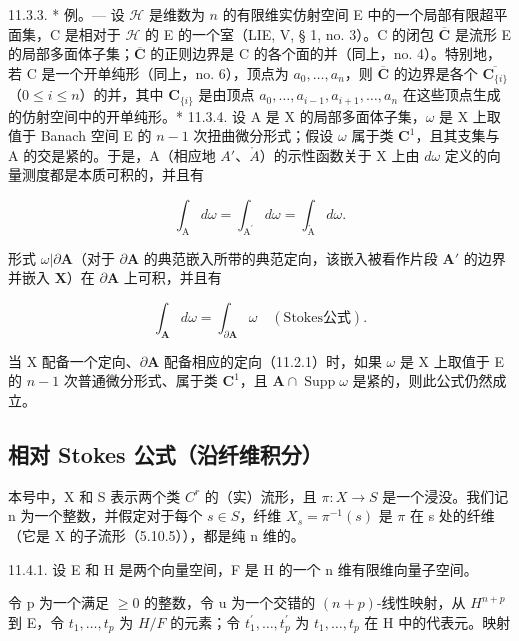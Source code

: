 11.3.3. * 例。--- 设 \(\mathcal{H}\) 是维数为 \(n\) 的有限维实仿射空间 E 中的一个局部有限超平面集，C 是相对于 \(\mathcal{H}\) 的 E 的一个室（LIE, V, § 1, no. 3）。C 的闭包 \(\overline{\mathbf{C}}\) 是流形 E 的局部多面体子集；\(\overline{\mathbf{C}}\) 的正则边界是 C 的各个面的并（同上，no. 4）。特别地，若 C 是一个开单纯形（同上，no. 6），顶点为 \(a_0, \ldots, a_n\)，则 \(\overline{\mathbf{C}}\) 的边界是各个 \(\overline{\mathbf{C}_{\{i\}}}\)（\(0 \leqslant i \leqslant n\)）的并，其中 \(\mathbf{C}_{\{i\}}\) 是由顶点 \(a_0, \ldots, a_{i-1}, a_{i+1}, \ldots, a_n\) 在这些顶点生成的仿射空间中的开单纯形。*
11.3.4. 设 A 是 X 的局部多面体子集，\(\omega\) 是 X 上取值于 Banach 空间 E 的 \(n - 1\) 次扭曲微分形式；假设 \(\omega\) 属于类 \(\mathbf{C}^1\)，且其支集与 A 的交是紧的。于是，A（相应地 \(A'\)、\(\mathring{A}\)）的示性函数关于 X 上由 \(d\omega\) 定义的向量测度都是本质可积的，并且有

\[
\int_ {\mathrm{A}} d \omega = \int_ {\mathrm{A} ^ {\prime}} d \omega = \int_ {\mathring{\mathrm{A}}} d \omega.
\]

形式 \(\omega|\partial\mathbf{A}\)（对于 \(\partial\mathbf{A}\) 的典范嵌入所带的典范定向，该嵌入被看作片段 \(\mathbf{A}'\) 的边界并嵌入 \(\mathbf{X}\)）在 \(\partial\mathbf{A}\) 上可积，并且有

\[
\int_ {\mathbf {A}} d \omega = \int_ {\partial \mathbf {A}} \omega \quad (\text{Stokes公式}).
\]

当 X 配备一个定向、\(\partial\mathbf{A}\) 配备相应的定向（11.2.1）时，如果 \(\omega\) 是 X 上取值于 E 的 \(n-1\) 次普通微分形式、属于类 \(\mathbf{C}^{1}\)，且 \(\mathbf{A}\cap\operatorname{Supp}\omega\) 是紧的，则此公式仍然成立。

\subsection{相对 Stokes 公式（沿纤维积分）}

本号中，X 和 S 表示两个类 \(C^{r}\) 的（实）流形，且 \(\pi: X \to S\) 是一个浸没。我们记 n 为一个整数，并假定对于每个 \(s \in S\)，纤维 \(X_{s} = \pi^{-1}(s)\) 是 \(\pi\) 在 s 处的纤维（它是 X 的子流形（5.10.5）），都是纯 n 维的。

11.4.1. 设 E 和 H 是两个向量空间，F 是 H 的一个 n 维有限维向量子空间。

令 p 为一个满足 \(\geqslant0\) 的整数，令 u 为一个交错的 \((n+p)\)-线性映射，从 \(H^{n+p}\) 到 E，令 \(t_{1},\ldots,t_{p}\) 为 \(H/F\) 的元素；令 \(t_{1}^{\prime},\ldots,t_{p}^{\prime}\) 为 \(t_{1},\ldots,t_{p}\) 在 H 中的代表元。映射

